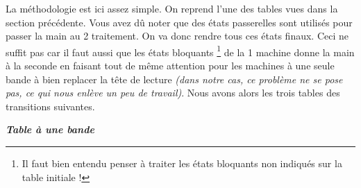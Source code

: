 La méthodologie est ici assez simple. On reprend l'une des tables vues dans la section précédente.
Vous avez dû noter que des états passerelles sont utilisés pour passer la main au 2\ieme{} traitement. On va donc rendre tous ces états finaux.
Ceci ne suffit pas car il faut aussi que les états bloquants
\footnote{
    Il faut bien entendu penser à traiter les états bloquants non indiqués sur la table initiale !
}
de la 1\iere{} machine donne la main à la seconde en faisant tout de même attention pour les machines à une seule bande à bien replacer la tête de lecture \emph{(dans notre cas, ce problème ne se pose pas, ce qui nous enlève un peu de travail)}.
Nous avons alors les trois tables des transitions suivantes.



\begin{center}
    \emph{\bfseries Table à une bande }


\end{center}
